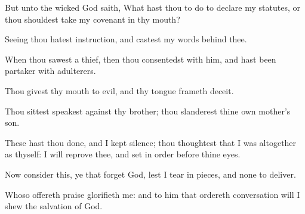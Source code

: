 {\Q {}But unto the
wicked
God
saith, What hast thou to do to
declare my
statutes, or
{} thou shouldest
take my
covenant in thy
mouth?


\par }{\Q {}Seeing thou
hatest
instruction, and
castest my
words
behind thee.


\par }{\Q {}When thou
sawest a
thief, then thou
consentedst with him, and hast been
partaker with
adulterers.


\par }{\Q {}Thou
givest thy
mouth to
evil, and thy
tongue
frameth
deceit.


\par }{\Q {}Thou
sittest
{}
speakest against thy
brother;
thou
slanderest thine own
mother’s
son.


\par }{\Q {}These
{} hast thou
done, and I kept
silence; thou
thoughtest that I was
altogether
{} as thyself:
{} I will
reprove thee, and set
{} in
order before thine
eyes.


\par }{\Q {}Now
consider this, ye that
forget
God, lest I tear
{} in
pieces, and
{} none to
deliver.


\par }{\Q {}Whoso
offereth
praise
glorifieth me: and to him that
ordereth
{}
conversation
{} will I
shew the
salvation of
God.




\par }
